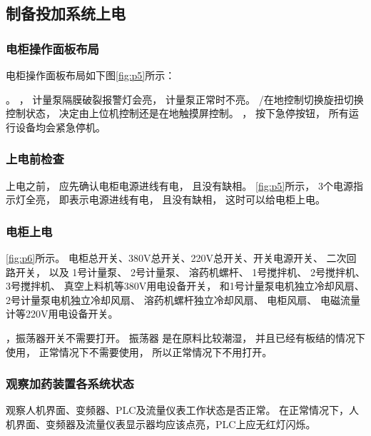 \documentclass[UTF8,a4paper,12pt,titlepage]{ctexart}
\begin{document}
\newpage %

   \subsection{制备投加系统上电}
        \subsubsection{电柜操作面板布局}
        电柜操作面板布局如下图\ref*{fig:p5}所示：

        

        。
        ，
        计量泵隔膜破裂报警灯会亮，
        计量泵正常时不亮。
        /在地控制切换旋扭切换控制状态，
        决定由上位机控制还是在地触摸屏控制。
        ，
        按下急停按钮，
        所有运行设备均会紧急停机。

      \subsubsection{上电前检查}
         上电之前，
         应先确认电柜电源进线有电，
         且没有缺相。
      \ref{fig:p5}所示，
      3个电源指示灯全亮，
      即表示电源进线有电，
      且没有缺相，
      这时可以给电柜上电。

      \newpage %

      \subsubsection{电柜上电}\label{sec:power-on}
        

      \ref{fig:p6}所示。
      电柜总开关、380V总开关、220V总开关、开关电源开关、
      二次回路开关，
      以及
      1号计量泵、
      2号计量泵、
      溶药机螺杆、
      1号搅拌机、
      2号搅拌机、
      3号搅拌机、
      真空上料机等380V用电设备开关，
      和1号计量泵电机独立冷却风扇、
      2号计量泵电机独立冷却风扇、
      溶药机螺杆独立冷却风扇、
      电柜风扇、
      电磁流量计等220V用电设备开关。

      ，振荡器开关不需要打开。
      振荡器 是在原料比较潮湿，
      并且已经有板结的情况下使用，
      正常情况下不需要使用，
      所以正常情况下不用打开。

      \subsubsection{观察加药装置各系统状态}
      观察人机界面、变频器、PLC及流量仪表工作状态是否正常。
      在正常情况下，人机界面、变频器及流量仪表显示器均应该点亮，PLC上应无红灯闪烁。
\end{document}
